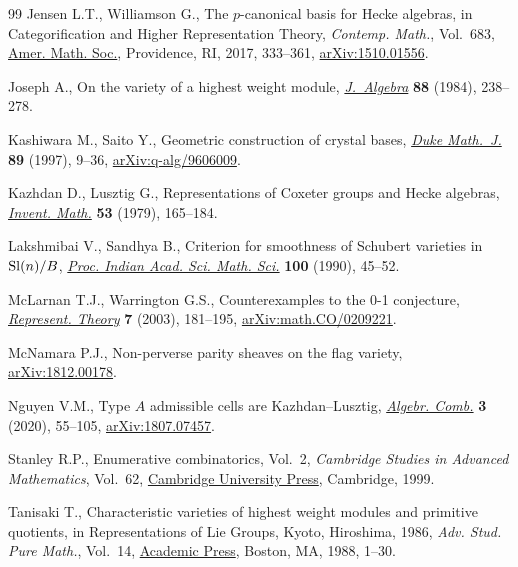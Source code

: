 \documentclass[pdftex]{sigma}
\numberwithin{equation}{section}
\begin{document}
\begin{thebibliography}{99}
Jensen L.T., Williamson G., The {$p$}-canonical basis for {H}ecke algebras, in
 Categorification and Higher Representation Theory, \textit{Contemp. Math.},
 Vol.~683, \href{https://doi.org/10.1090/conm/683}{Amer. Math. Soc.}, Providence, RI, 2017, 333--361,
 \href{https://arxiv.org/abs/1510.01556}{arXiv:1510.01556}.

Joseph A., On the variety of a highest weight module, \href{https://doi.org/10.1016/0021-8693(84)90100-5}{\textit{J.~Algebra}}
 \textbf{88} (1984), 238--278.

Kashiwara M., Saito Y., Geometric construction of crystal bases, \href{https://doi.org/10.1215/S0012-7094-97-08902-X}{\textit{Duke
 Math.~J.}} \textbf{89} (1997), 9--36, \href{https://arxiv.org/abs/q-alg/9606009}{arXiv:q-alg/9606009}.

Kazhdan D., Lusztig G., Representations of {C}oxeter groups and {H}ecke
 algebras, \href{https://doi.org/10.1007/BF01390031}{\textit{Invent. Math.}} \textbf{53} (1979), 165--184.

Lakshmibai V., Sandhya B., Criterion for smoothness of {S}chubert varieties in
 {${\rm Sl}(n)/B$}, \href{https://doi.org/10.1007/BF02881113}{\textit{Proc. Indian Acad. Sci. Math. Sci.}} \textbf{100}
 (1990), 45--52.

McLarnan T.J., Warrington G.S., Counterexamples to the 0-1 conjecture,
 \href{https://doi.org/10.1090/S1088-4165-03-00178-X}{\textit{Represent. Theory}} \textbf{7} (2003), 181--195,
 \href{https://arxiv.org/abs/math.CO/0209221}{arXiv:math.CO/0209221}.

McNamara P.J., Non-perverse parity sheaves on the flag variety,
 \href{https://arxiv.org/abs/1812.00178}{arXiv:1812.00178}.

Nguyen V.M., Type {$A$} admissible cells are {K}azhdan--{L}usztig,
 \href{https://doi.org/10.5802/alco.91}{\textit{Algebr. Comb.}} \textbf{3} (2020), 55--105, \href{https://arxiv.org/abs/1807.07457}{arXiv:1807.07457}.

Stanley R.P., Enumerative combinatorics, {V}ol.~2, \textit{Cambridge Studies in
 Advanced Mathematics}, Vol.~62, \href{https://doi.org/10.1017/CBO9780511609589}{Cambridge University Press}, Cambridge, 1999.

Tanisaki T., Characteristic varieties of highest weight modules and primitive
 quotients, in Representations of {L}ie Groups, {K}yoto, {H}iroshima, 1986,
 \textit{Adv. Stud. Pure Math.}, Vol.~14, \href{https://doi.org/10.2969/aspm/01410001}{Academic Press}, Boston, MA, 1988,
 1--30.


\end{thebibliography}
\end{document}
